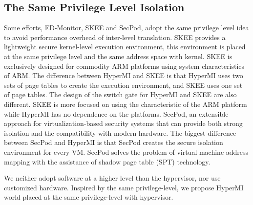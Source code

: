 \documentclass[conference]{IEEEtran}
\begin{document}
\subsection{The Same Privilege Level Isolation}
Some efforts, ED-Monitor\cite{Deng2017Dancing}, SKEE\cite{Azab2016SKEE} and SecPod\cite{Wang2015SecPod}, adopt the same privilege level idea to avoid performance overhead of inter-level translation.
 SKEE provides a lightweight secure kernel-level execution environment, this environment is placed at the same privilege level and the same address space with kernel. SKEE is exclusively designed for commodity ARM platforms using system characteristics of ARM. The difference between HyperMI and SKEE is that HyperMI uses two sets of page tables to create the execution environment, and SKEE uses one set of page tables. The design of the switch gate for HyperMI and SKEE are also different. SKEE is more focused on using the characteristic of the ARM platform while HyperMI has no dependence on the platforms.
SecPod, an extensible approach for virtualization-based security systems that can provide both strong isolation and the compatibility with modern hardware. The biggest difference between SecPod and HyperMI is that SecPod creates the secure isolation environment for every VM. SecPod solves the problem of virtual machine address mapping with the assistance of shadow page table (SPT) technology.

We neither adopt software at a higher level than the hypervisor, nor use customized hardware. Inspired by the same privilege-level, we propose HyperMI world placed at the same privilege-level with hypervisor.
\end{document}
